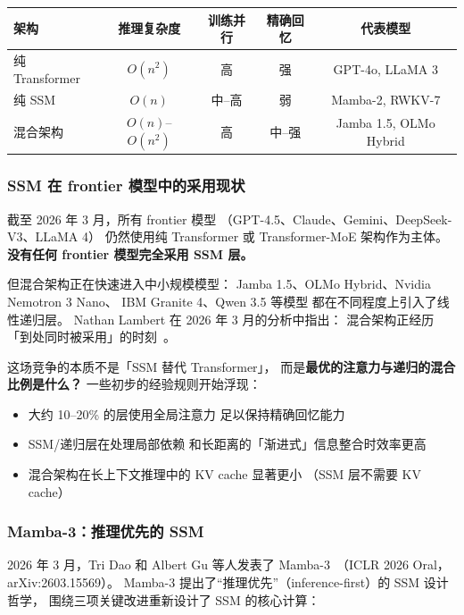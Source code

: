\begin{center}\small
\renewcommand{\arraystretch}{1.3}
\begin{tabular}{lcccc}
\toprule
\rowcolor{figLightGray}
\textbf{架构} & \textbf{推理复杂度} & \textbf{训练并行} & \textbf{精确回忆} & \textbf{代表模型} \\
\midrule
纯 Transformer & $O(n^2)$ & 高 & 强 & GPT-4o, LLaMA 3 \\
纯 SSM & $O(n)$ & 中--高 & 弱 & Mamba-2, RWKV-7 \\
混合架构 & $O(n)$--$O(n^2)$ & 高 & 中--强 & Jamba 1.5, OLMo Hybrid \\
\bottomrule
\end{tabular}
\end{center}

\subsubsection{SSM 在 frontier 模型中的采用现状}

截至 2026 年 3 月，所有 frontier 模型
（GPT-4.5、Claude、Gemini、DeepSeek-V3、LLaMA 4）
仍然使用纯 Transformer 或 Transformer-MoE 架构作为主体。
\textbf{没有任何 frontier 模型完全采用 SSM 层。}

但混合架构正在快速进入中小规模模型：
Jamba 1.5、OLMo Hybrid、Nvidia Nemotron 3 Nano、
IBM Granite 4、Qwen 3.5 等模型
都在不同程度上引入了线性递归层。
Nathan Lambert 在 2026 年 3 月的分析中指出：
混合架构正经历「到处同时被采用」的时刻~\cite{lambert2026hybrid}。

这场竞争的本质不是「SSM 替代 Transformer」，
而是\textbf{最优的注意力与递归的混合比例是什么？}
一些初步的经验规则开始浮现：
\begin{itemize}[noitemsep]
  \item 大约 10--20\% 的层使用全局注意力
        足以保持精确回忆能力
  \item SSM/递归层在处理局部依赖
        和长距离的「渐进式」信息整合时效率更高
  \item 混合架构在长上下文推理中的 KV cache 显著更小
        （SSM 层不需要 KV cache）
\end{itemize}

\subsubsection{Mamba-3：推理优先的 SSM}

2026 年 3 月，Tri Dao 和 Albert Gu 等人发表了
Mamba-3~\cite{mamba32026}（ICLR 2026 Oral，arXiv:2603.15569）。
Mamba-3 提出了“推理优先”（inference-first）的 SSM 设计哲学，
围绕三项关键改进重新设计了 SSM 的核心计算：


